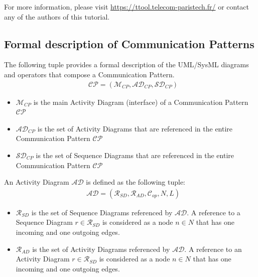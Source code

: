 \documentclass{llncs}
\begin{document}
For more information, please visit \url{https://ttool.telecom-paristech.fr/} or
contact any of the authors of this tutorial.
%

\newpage
\begin{subappendices}
%
\section{Formal description of Communication Patterns}
\label{app:FormalCP}
%
The following tuple provides a formal description of the UML/SysML diagrams and operators that compose a Communication
Pattern.
%
\begin{align*}
&\mathcal{CP} = ( \mathcal{M}_{CP}, \mathcal{AD}_{CP}, \mathcal{SD}_{CP} )
\end{align*}
%
%
\begin{itemize}
	\item $\mathcal{M}_{CP}$ is the main Activity Diagram (interface) of a Communication Pattern $\mathcal{CP}$
	\item $\mathcal{AD}_{CP}$ is the set of Activity Diagrams that are referenced in the entire Communication Pattern
	$\mathcal{CP}$
	\item $\mathcal{SD}_{CP}$ is the set of Sequence Diagrams that are referenced in the entire Communication Pattern
	$\mathcal{CP}$
%
\end{itemize}
%
An Activity Diagram $\mathcal{AD}$ is defined as the following tuple:
%
\begin{align*}
&\mathcal{AD} = ( \mathcal{R}_{SD}, \mathcal{R}_{AD}, \mathcal{C}_{op}, N, L )
\end{align*}
%
%
\begin{itemize}
	\item $\mathcal{R}_{SD}$ is the set of Sequence Diagrams referenced by $\mathcal{AD}$. A reference to a Sequence Diagram $r \in
	\mathcal{R}_{SD}$ is considered as a node $n \in N$ that has one incoming and one outgoing edges.
	\item $\mathcal{R}_{AD}$ is the set of Activity Diagrams referenced by $\mathcal{AD}$. A reference to an Activity Diagram $r \in
	\mathcal{R}_{SD}$ is considered as a node $n \in N$ that has one incoming and one outgoing edges.

\end{itemize}
\end{subappendices}
\end{document}

